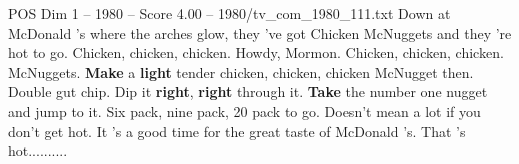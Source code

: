 \begin{textsample}{POS Dim 1 – 1980 – Score 4.00 – 1980/tv\_com\_1980\_111.txt}  \label{ex:f1_pos_050}
Down at McDonald 's where the arches glow, they 've got Chicken McNuggets and they 're hot to go.
Chicken, chicken, chicken.
Howdy, Mormon.
Chicken, chicken, chicken.
McNuggets. \textbf{Make} a \textbf{light} tender chicken, chicken, chicken McNugget then.
Double gut chip.
Dip it \textbf{right}, \textbf{right} through it. \textbf{Take} the number one nugget and jump to it.
Six pack, nine pack, 20 pack to go.
Doesn't mean a lot if you don't get hot.
It 's a good time for the great taste of McDonald 's.
That 's hot..........

\end{textsample}
